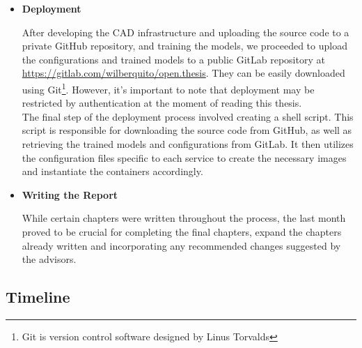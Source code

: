 \begin{itemize}
  \item{\textbf{Deployment}}

    After developing the CAD infrastructure and uploading the source code to a
    private GitHub repository, and training the models, we proceeded to upload
    the configurations and trained models to a public GitLab repository at
    \url{https://gitlab.com/wilberquito/open.thesis}. They can be easily
    downloaded using Git\footnote{Git is version control software designed by
    Linus Torvalds}. However, it's important to note that deployment may be
    restricted by authentication at the moment of reading this thesis. \\

    The final step of the deployment process involved creating a shell script.
    This script is responsible for downloading the source code from GitHub, as
    well as retrieving the trained models and configurations from GitLab. It
    then utilizes the configuration files specific to each service to create
    the necessary
    images and instantiate the containers accordingly.

  \item{\textbf{Writing the Report}}

    While certain chapters were written throughout the process, the last month
    proved to be crucial for completing the final chapters, expand the chapters
    already written and incorporating any recommended changes suggested by the
    advisors.

\end{itemize}

\newpage

\subsection{Timeline}

